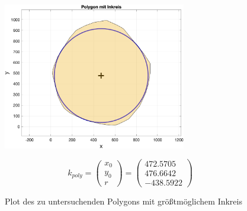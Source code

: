 \documentclass[12pt]{scrartcl}
\begin{document}
\begin{figure}[ht]
    \centering
    \begin{minipage}[c]{8cm}
        \includegraphics[width=8cm]{Polygon.png}
    \end{minipage}%
    \begin{minipage}[c]{7cm}
        \begin{equation}
            k_{poly} = \begin{pmatrix} x_0 \\ y_0 \\ r \end{pmatrix} = \begin{pmatrix} 472.5705 \\ 476.6642 \\ -438.5922 \end{pmatrix}
        \end{equation}
    \end{minipage}
    \caption{Plot des zu untersuchenden Polygons mit größtmöglichem Inkreis}
    \label{fig:Polygon}
\end{figure}


\end{document}
